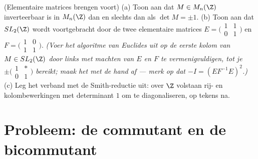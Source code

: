 \begin{exercise}[$\star\star\star$]\label{exo:b3:modules:12}
(Elementaire matrices brengen voort) (a) Toon aan dat $M \in
M_n(\Z)$ inverteerbaar is in $M_n(\Z)$ dan en slechts dan als
$\det M = \pm1$.
(b) Toon aan dat $SL_2(\Z)$ wordt voortgebracht door de twee
elementaire matrices $E = \bigl(\begin{smallmatrix}1 & 1\\ 0 &
1\end{smallmatrix}\bigr)$ en $F = \bigl(\begin{smallmatrix}1 & 0\\
1 & 1\end{smallmatrix}\bigr)$.
\emph{(Voer het algoritme van Euclides uit op de eerste kolom van
$M \in SL_2(\Z)$ door links met machten van $E$ en $F$ te
vermenigvuldigen, tot je $\pm\bigl(\begin{smallmatrix}1 & *\\ 0 &
1\end{smallmatrix}\bigr)$ bereikt; maak het met de hand af ---
merk op dat $-I = (EF^{-1}E)^2$.)}
(c) Leg het verband met de Smith-reductie uit: over $\Z$ volstaan
rij- en kolombewerkingen met determinant $1$ om te
diagonaliseren, op tekens na.
\end{exercise}

\section{Probleem: de commutant en de bicommutant}

